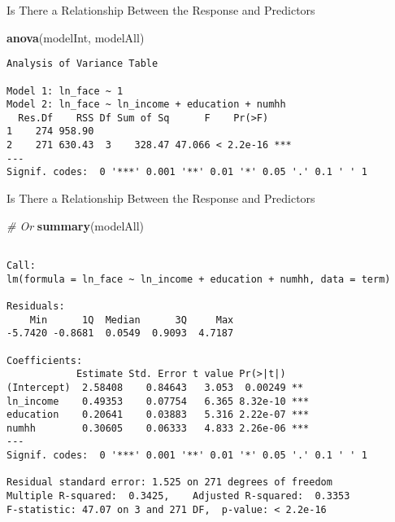 \documentclass[
  ignorenonframetext,
]{beamer}
\newenvironment{Shaded}{\begin{snugshade}}{\end{snugshade}}
\newcommand{\CommentTok}[1]{\textcolor[rgb]{0.56,0.35,0.01}{\textit{#1}}}
\newcommand{\FunctionTok}[1]{\textcolor[rgb]{0.13,0.29,0.53}{\textbf{#1}}}
\newcommand{\NormalTok}[1]{#1}
\begin{document}
\begin{frame}[fragile]{Is There a Relationship Between the Response and
Predictors}
\protect\hypertarget{is-there-a-relationship-between-the-response-and-predictors-2}{}
\normalsize

\begin{Shaded}
\begin{Highlighting}[]
\FunctionTok{anova}\NormalTok{(modelInt, modelAll)}
\end{Highlighting}
\end{Shaded}

\begin{verbatim}
Analysis of Variance Table

Model 1: ln_face ~ 1
Model 2: ln_face ~ ln_income + education + numhh
  Res.Df    RSS Df Sum of Sq      F    Pr(>F)    
1    274 958.90                                  
2    271 630.43  3    328.47 47.066 < 2.2e-16 ***
---
Signif. codes:  0 '***' 0.001 '**' 0.01 '*' 0.05 '.' 0.1 ' ' 1
\end{verbatim}

\normalsize
\end{frame}

\begin{frame}[fragile]{Is There a Relationship Between the Response and
Predictors}
\protect\hypertarget{is-there-a-relationship-between-the-response-and-predictors-3}{}
\scriptsize

\begin{Shaded}
\begin{Highlighting}[]
\CommentTok{\# Or}
\FunctionTok{summary}\NormalTok{(modelAll)}
\end{Highlighting}
\end{Shaded}

\begin{verbatim}

Call:
lm(formula = ln_face ~ ln_income + education + numhh, data = term)

Residuals:
    Min      1Q  Median      3Q     Max 
-5.7420 -0.8681  0.0549  0.9093  4.7187 

Coefficients:
            Estimate Std. Error t value Pr(>|t|)    
(Intercept)  2.58408    0.84643   3.053  0.00249 ** 
ln_income    0.49353    0.07754   6.365 8.32e-10 ***
education    0.20641    0.03883   5.316 2.22e-07 ***
numhh        0.30605    0.06333   4.833 2.26e-06 ***
---
Signif. codes:  0 '***' 0.001 '**' 0.01 '*' 0.05 '.' 0.1 ' ' 1

Residual standard error: 1.525 on 271 degrees of freedom
Multiple R-squared:  0.3425,    Adjusted R-squared:  0.3353 
F-statistic: 47.07 on 3 and 271 DF,  p-value: < 2.2e-16
\end{verbatim}

\normalsize
\end{frame}
\end{document}
